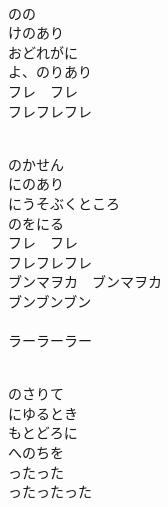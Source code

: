 \documentclass[10pt,b5j]{tarticle} %
\begin{document}
\vspace{1.5em} %
\newcommand{\linespace}{0.5em} %
\newcommand{\blocksize}{0.5\hsize} %
\newcommand{\itemmargin}{6em} %
\begin{enumerate} %
    \setlength{\itemindent}{\itemmargin} %
    \begin{minipage}[c]{\blocksize}
    
        \vspace{\linespace}
        \item~\\
        のの\\
        けのあり\\
        おどれがに\\
        よ、のりあり\\
        フレ　フレ\\
        フレフレフレ
        
        \vspace{\linespace}
        \item~\\
        のかせん\\
        にのあり\\
        にうそぶくところ\\
        のをにる\\
        フレ　フレ\\
        フレフレフレ\\
        ブンマヲカ　ブンマヲカ\\
        ブンブンブン\\
        　\\
        ラーラーラー
        
        \vspace{\linespace}
        \item~\\
        のさりて\\
        にゆるとき\\
        もとどろに\\
        へのちを\\
        ったった\\
        ったったった
        

\end{minipage}
\end{enumerate}
\end{document}
